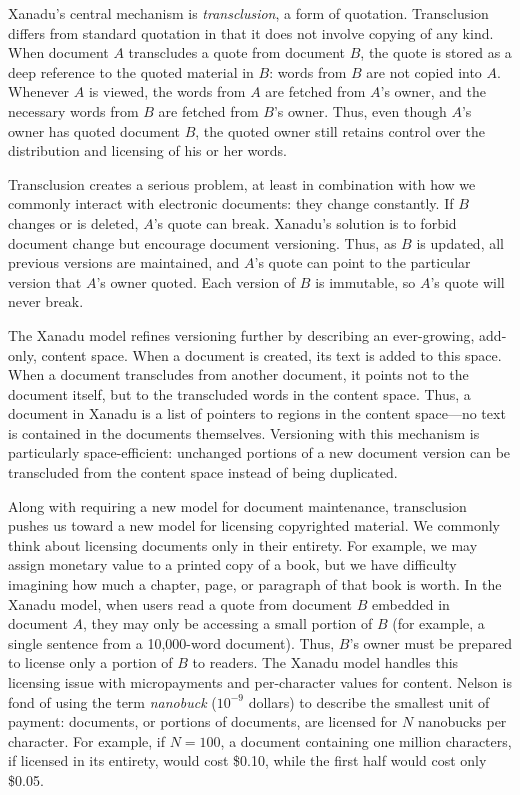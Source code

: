 \documentclass{acm_proc_article-sp}
\begin{document}
Xanadu's central mechanism is \textit{transclusion}, a form of quotation.  
Transclusion differs from standard quotation in that it does not involve copying of any kind.  
When document $A$ transcludes a quote from document $B$, the quote is stored as a deep reference to the quoted material in $B$:  words from $B$ are not copied into $A$. 
Whenever $A$ is viewed, the words from $A$ are fetched from $A$'s owner, and the necessary words from $B$ are fetched from $B$'s owner.
Thus, even though $A$'s owner has quoted document $B$, the quoted owner still retains control over the distribution and licensing of his or her words.

Transclusion creates a serious problem, at least in combination with how we commonly interact with electronic documents:  they change constantly.
If $B$ changes or is deleted, $A$'s quote can break.
Xanadu's solution is to forbid document change but encourage document versioning.
Thus, as $B$ is updated, all previous versions are maintained, and $A$'s quote can point to the particular version that $A$'s owner quoted.
Each version of $B$ is immutable, so $A$'s quote will never break.

The Xanadu model refines versioning further by describing an ever-growing, add-only, content space.  
When a document is created, its text is added to this space.
When a document transcludes from another document, it points not to the document itself, but to the transcluded words in the content space.
Thus, a document in Xanadu is a list of pointers to regions in the content space---no text is contained in the documents themselves.
Versioning with this mechanism is particularly space-efficient:  unchanged portions of a new document version can be transcluded from the content space instead of being duplicated.

Along with requiring a new model for document maintenance, transclusion pushes us toward a new model for licensing copyrighted material.
We commonly think about licensing documents only in their entirety.
For example, we may assign monetary value to a printed copy of a book, but we have difficulty imagining how much a chapter, page, or paragraph of that book is worth.
In the Xanadu model, when users read a quote from document $B$ embedded in document $A$, they may only be accessing a small portion of $B$ (for example, a single sentence from a 10,000-word document).
Thus, $B$'s owner must be prepared to license only a portion of $B$ to readers.
The Xanadu model handles this licensing issue with micropayments and per-character values for content.
Nelson is fond of using the term \textit{nanobuck} ($10^{-9}$ dollars) to describe the smallest unit of payment:  documents, or portions of documents, are licensed for $N$ nanobucks per character.
For example, if $N=100$, a document containing one million characters, if licensed in its entirety, would cost \$0.10, while the first half would cost only \$0.05.
\end{document}
